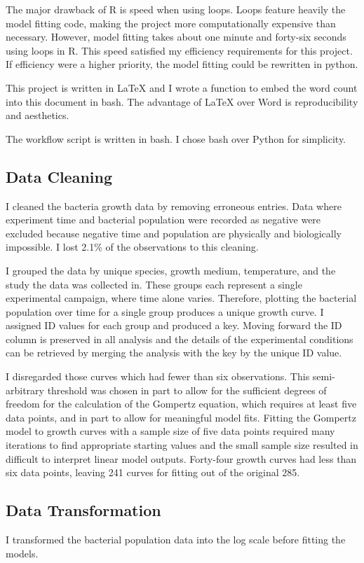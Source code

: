 \documentclass[11pt]{article}
\begin{document}
  The major drawback of R is speed when using loops. Loops feature heavily the model fitting code, making the project more computationally expensive than necessary. However, model fitting takes about one minute and forty-six seconds using loops in R. This speed satisfied my efficiency requirements for this project. If efficiency were a higher priority, the model fitting could be rewritten in python. 

  This project is written in LaTeX and I wrote a function to embed the word count into this document in bash. The advantage of LaTeX over Word is reproducibility and aesthetics. 

  The workflow script is written in bash. I chose bash over Python for simplicity.  

  \subsection{Data Cleaning}
  I cleaned the bacteria growth data by removing erroneous entries. Data where experiment time and bacterial population were recorded as negative were excluded because negative time and population are physically and biologically impossible. I lost 2.1\% of the observations to this cleaning. 

  I grouped the data by unique species, growth medium, temperature, and the study the data was collected in. These groups each represent a single experimental campaign, where time alone varies. Therefore, plotting the  bacterial population over time for a single group produces a unique growth curve. I assigned ID values for each group and produced a key. Moving forward the ID column is preserved in all analysis and the details of the experimental conditions can be retrieved by merging the analysis with the key by the unique ID value. 

  I disregarded those curves which had fewer than six observations. This semi-arbitrary threshold was chosen in part to allow for the sufficient degrees of freedom for the calculation of the Gompertz equation, which requires at least five data points, and in part to allow for meaningful model fits. Fitting the Gompertz model to growth curves with a sample size of five data points required many iterations to find appropriate starting values and the small sample size resulted in difficult to interpret linear model outputs. Forty-four growth curves had less than six data points, leaving 241 curves for fitting out of the original 285.

  \subsection{Data Transformation}
  I transformed the bacterial population data into the log scale before fitting the models.  
\end{document}
